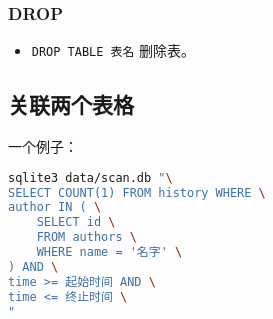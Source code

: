 \subsubsection{DROP}
\begin{itemize}
\item \verb|DROP TABLE 表名| 删除表。
\end{itemize}


\subsection{关联两个表格}
一个例子：
\begin{lstlisting}[language=bash,caption=stat.sh]
sqlite3 data/scan.db "\
SELECT COUNT(1) FROM history WHERE \
author IN ( \
    SELECT id \
    FROM authors \
    WHERE name = '名字' \
) AND \
time >= 起始时间 AND \
time <= 终止时间 \
"
\end{lstlisting}
